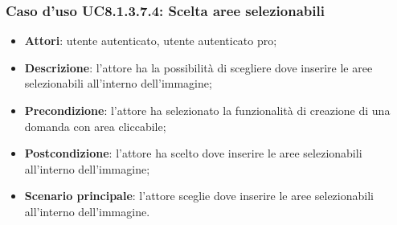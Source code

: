 \subsubsection{Caso d'uso UC8.1.3.7.4: Scelta aree selezionabili}
\begin{itemize}
	\item \textbf{Attori}: utente autenticato, utente autenticato pro;
	\item \textbf{Descrizione}: l'attore ha la possibilità di scegliere dove inserire le aree selezionabili all'interno dell'immagine;
	\item \textbf{Precondizione}: l'attore ha selezionato la funzionalità di creazione di una domanda con area cliccabile; 
	\item \textbf{Postcondizione}: l'attore ha scelto dove inserire le aree selezionabili all'interno dell'immagine;
	\item \textbf{Scenario principale}: l'attore sceglie dove inserire le aree selezionabili all'interno dell'immagine. 	
\end{itemize}

